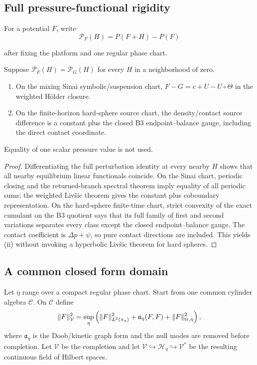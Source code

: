 \subsection{Full pressure-functional rigidity}

For a potential $F$, write
\[
 \mathscr P_F(H)=P(F+H)-P(F)
\]

after fixing the platform and one regular phase chart.

\begin{theorem}
\label{thm:r13-c2-rigidity}
Suppose $\mathscr P_F(H)=\mathscr P_G(H)$ for every $H$ in a neighborhood of
zero.
\begin{enumerate}[label=(\roman*)]
\item On the mixing Sinai symbolic/suspension chart,
$F-G=c+U-U\circ\Theta$ in the weighted Hölder closure.
\item On the finite-horizon hard-sphere source chart, the density/contact
source difference is a constant plus the closed B3 endpoint--balance gauge,
including the direct contact coordinate.
\end{enumerate}
Equality of one scalar pressure value is not used.
\end{theorem}

\begin{proof}
Differentiating the full perturbation identity at every nearby $H$ shows that
all nearby equilibrium linear functionals coincide.  On the Sinai chart,
periodic closing and the returned-branch spectral theorem imply equality of
all periodic sums; the weighted Livšic theorem gives the constant plus
coboundary representation.  On the hard-sphere finite-time chart, strict
convexity of the exact cumulant on the B3 quotient says that its full family of
first and second variations separates every class except the closed
endpoint--balance gauge.  The contact coefficient is $\Delta p+\psi$, so pure
contact directions are included.  This yields (ii) without invoking a
hyperbolic Livšic theorem for hard spheres.
\end{proof}

\subsection{A common closed form domain}

Let $\eta$ range over a compact regular phase chart.  Start from one common
cylinder algebra $\mathcal C$.  On $\mathcal C$ define
\[
 \|F\|_{\mathcal V}^2
 =\sup_\eta
 \left(\|F\|_{L^2(\pi_\eta)}^2+
       \mathfrak a_\eta(F,F)+
       \|F\|_{\rm tr,\eta}^2\right),
\]
where $\mathfrak a_\eta$ is the Doob/kinetic graph form and the null modes are
removed before completion.  Let $\mathcal V$ be the completion and let
$\mathcal V\hookrightarrow\mathcal H_\eta\hookrightarrow\mathcal V^*$ be the
resulting continuous field of Hilbert spaces.

